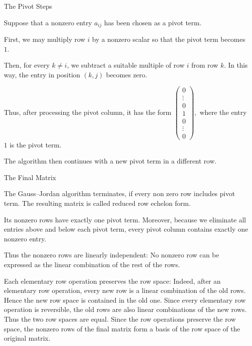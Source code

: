 \begin{frame}{The Pivot Steps}

Suppose that a nonzero entry \(a_{ij}\) has been chosen as a pivot
term.

First, we may multiply row \(i\) by a nonzero scalar so that the pivot
term becomes \(1\).

Then, for every \(k\neq i\), we subtract a suitable multiple of row
\(i\) from row \(k\). In this way, the entry in position \((k,j)\)
becomes zero.

Thus, after processing the pivot column, it has the form
\(
\begin{pmatrix}
0\\
\vdots\\
0\\
1\\
0\\
\vdots\\
0
\end{pmatrix},
\)
where the entry \(1\) is the pivot term.

The algorithm then continues with a new pivot term in a different row.
\end{frame}
\begin{frame}{The Final Matrix}

The Gauss--Jordan algorithm terminates, if every non zero row includes pivot term.
The resulting matrix is called \alert{reduced row echelon form}.

Its nonzero rows have exactly one pivot term.
Moreover, because we eliminate all entries above and below
each pivot term, every pivot column contains exactly one nonzero entry.

Thus the nonzero rows are linearly independent: No nonzero row can be expressed as the linear combination of the rest of the rows.

Each elementary row operation preserves the row space:
Indeed, after an elementary row operation, every new row is a linear
combination of the old rows. Hence the new row space is contained in
the old one. Since every elementary row operation is reversible, the
old rows are also linear combinations of the new rows. Thus the two
row spaces are equal.
Since the row operations preserve the row space, the nonzero rows of
the final matrix form a basis of the row space of the original matrix.
\end{frame}

